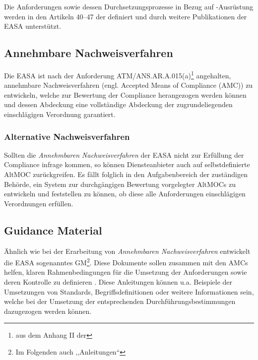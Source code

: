     Die Anforderungen sowie dessen Durchsetzungsprozesse in Bezug auf \atmans-Ausrüstung werden in den Artikeln 40--47 der  definiert und durch weitere Publikationen der \ac{EASA} unterstützt.
        
\pagebreak
\subsection{Annehmbare Nachweisverfahren}

    Die \ac{EASA} ist nach der Anforderung \textsf{ATM/ANS.AR.A.015(a)}\footnote{aus dem Anhang II der } angehalten, annehmbare Nachweisverfahren (engl. Accepted Means of Compliance (\acs{AMC})) zu entwickeln, welche zur Bewertung der Compliance herangezogen werden können und dessen Abdeckung eine vollständige Abdeckung der zugrundeliegenden einschlägigen Verordnung garantiert. 
    \cite[Anh. II]{2017R0373}

\subsubsection{Alternative Nachweisverfahren}

    Sollten die \textit{Annehmbaren Nachweisverfahren} der \ac{EASA} nicht zur Erfüllung der Compliance infrage kommen, so können Diensteanbieter auch auf selbstdefinierte \acf{AltMOC} zurückgreifen.
    Es fällt folglich in den Aufgabenbereich der zuständigen Behörde, ein System zur durchgängigen Bewertung  vorgelegter \acp{AltMOC} zu entwickeln und feststellen zu können, ob diese alle Anforderungen einschlägigen Verordnungen erfüllen.
    \cite[Anh. II \textsf{ATM/ANS.AR.A.015(b-e)}]{2017R0373}
        
\subsection{Guidance Material}

    Ähnlich wie bei der Erarbeitung von \textit{Annehmbaren Nachweisverfahren} entwickelt die \ac{EASA} sogenanntes \acf{GM}\footnote{Im Folgenden auch ,,Anleitungen``}.
    Diese Dokumente sollen zusammen mit den \acp{AMC} helfen, klaren Rahmenbedingungen für die Umsetzung der Anforderungen sowie deren Kontrolle zu definieren
    \cite[7]{easa_2017001r}.
    Diese Anleitungen können u.a. Beispiele der Umsetzungen von Standards, Begriffsdefinitionen oder weitere Informationen sein, welche bei der Umsetzung der entsprechenden Durchführungsbestimmungen dazugezogen werden können.

